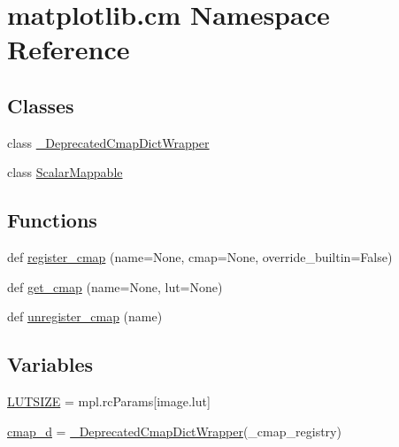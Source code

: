\hypertarget{namespacematplotlib_1_1cm}{}\section{matplotlib.\+cm Namespace Reference}
\label{namespacematplotlib_1_1cm}
\subsection*{Classes}
\begin{DoxyCompactItemize}
\item 
class \hyperlink{classmatplotlib_1_1cm_1_1__DeprecatedCmapDictWrapper}{\+\_\+\+Deprecated\+Cmap\+Dict\+Wrapper}
\item 
class \hyperlink{classmatplotlib_1_1cm_1_1ScalarMappable}{Scalar\+Mappable}
\end{DoxyCompactItemize}
\subsection*{Functions}
\begin{DoxyCompactItemize}
\item 
def \hyperlink{namespacematplotlib_1_1cm_aef0b7e3dfd1a5f520c1016f01c1ab0af}{register\+\_\+cmap} (name=None, cmap=None, override\+\_\+builtin=False)
\item 
def \hyperlink{namespacematplotlib_1_1cm_ab3c1845ac9e976ab44b80b378541a33a}{get\+\_\+cmap} (name=None, lut=None)
\item 
def \hyperlink{namespacematplotlib_1_1cm_a03c39fa84f05a5d6f8f35fbe5ee48e3c}{unregister\+\_\+cmap} (name)
\end{DoxyCompactItemize}
\subsection*{Variables}
\begin{DoxyCompactItemize}
\item 
\hyperlink{namespacematplotlib_1_1cm_ace896a2b4d7f8028cc508f0c4da233fe}{L\+U\+T\+S\+I\+ZE} = mpl.\+rc\+Params\mbox{[}\textquotesingle{}image.\+lut\textquotesingle{}\mbox{]}
\item 
\hyperlink{namespacematplotlib_1_1cm_ac2dd962b18f824e3ad20f79097390148}{cmap\+\_\+d} = \hyperlink{classmatplotlib_1_1cm_1_1__DeprecatedCmapDictWrapper}{\+\_\+\+Deprecated\+Cmap\+Dict\+Wrapper}(\+\_\+cmap\+\_\+registry)
\end{DoxyCompactItemize}


